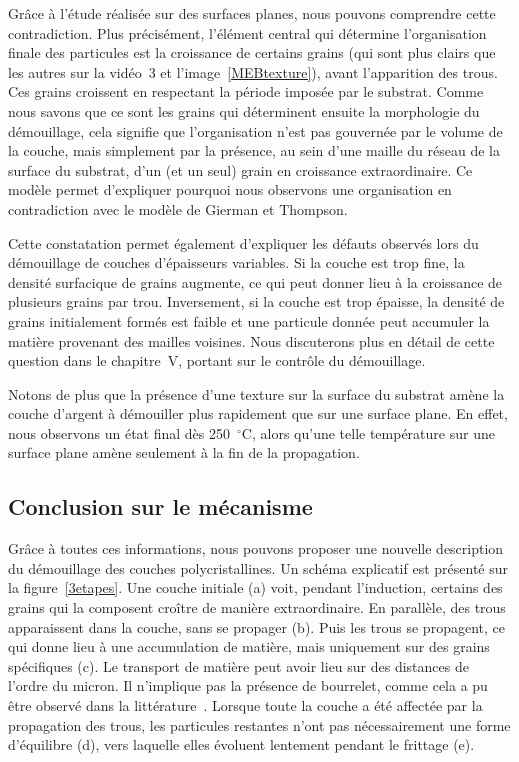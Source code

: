 Grâce à l'étude réalisée sur des surfaces planes, nous pouvons comprendre cette contradiction. Plus précisément, l'élément central qui détermine l'organisation finale des particules est la croissance de certains grains (qui sont plus clairs que les autres sur la vidéo~3 et l'image~\ref{MEBtexture}), avant l'apparition des trous. Ces grains croissent en respectant la période imposée par le substrat. Comme nous savons que ce sont les grains qui déterminent ensuite la morphologie du démouillage, cela signifie que l'organisation n'est pas gouvernée par le volume de la couche, mais simplement par la présence, au sein d'une maille du réseau de la surface du substrat, d'un (et un seul) grain en croissance extraordinaire. Ce modèle permet d'expliquer pourquoi nous observons une organisation en contradiction avec le modèle de Gierman et Thompson.\par
Cette constatation permet également d'expliquer les défauts observés lors du démouillage de couches d'épaisseurs variables. Si la couche est trop fine, la densité surfacique de grains augmente, ce qui peut donner lieu à la croissance de plusieurs grains par trou. Inversement, si la couche est trop épaisse, la densité de grains initialement formés est faible et une particule donnée peut accumuler la matière provenant des mailles voisines. Nous discuterons plus en détail de cette question dans le chapitre~V, portant sur le contrôle du démouillage.\par
Notons de plus que la présence d'une texture sur la surface du substrat amène la couche d'argent à démouiller plus rapidement que sur une surface plane. En effet, nous observons un état \og final \fg{} dès 250~$^\circ$C, alors qu'une telle température sur une surface plane amène seulement à la fin de la propagation.

\subsection{Conclusion sur le mécanisme}
Grâce à toutes ces informations, nous pouvons proposer une nouvelle description du démouillage des couches polycristallines. Un schéma explicatif est présenté sur la figure~\ref{3etapes}. Une couche initiale (a) voit, pendant l'induction, certains des grains qui la composent croître de manière extraordinaire. En parallèle, des trous apparaissent dans la couche, sans se propager (b). Puis les trous se propagent, ce qui donne lieu à une accumulation de matière, mais uniquement sur des grains spécifiques (c). Le transport de matière peut avoir lieu sur des distances de l'ordre du micron. Il n'implique pas la présence de bourrelet, comme cela a pu être observé dans la littérature~\cite{brandon1966mobility, atiya2014solid}. Lorsque toute la couche a été affectée par la propagation des trous, les particules restantes n'ont pas nécessairement une forme d'équilibre (d), vers laquelle elles évoluent lentement pendant le frittage (e). 


